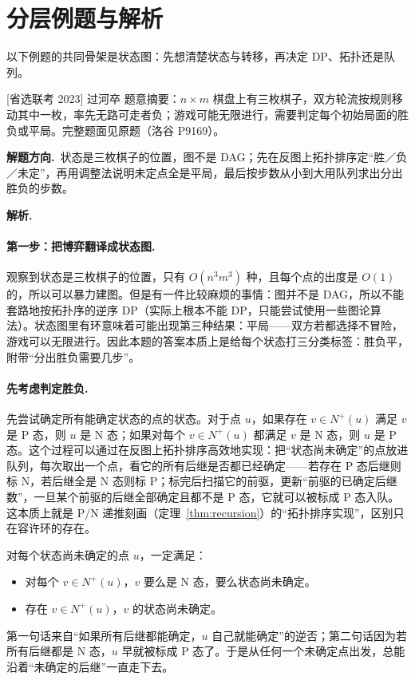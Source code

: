 \documentclass[UTF8,a4paper,11pt,oneside,openany,fontset=fandol]{ctexbook}
\theoremstyle{definition}
\newcommand{\Np}{N^+}
\newcommand{\sol}{\par\noindent\textbf{解析.}\ }
\newcommand{\hint}{\par\noindent\textbf{解题方向.}\ }
\begin{document}
\section{分层例题与解析}

以下例题的共同骨架是状态图：先想清楚状态与转移，再决定 DP、拓扑还是队列。

\begin{problem}{[省选联考 2023] 过河卒}
题意摘要：$n\times m$ 棋盘上有三枚棋子，双方轮流按规则移动其中一枚，率先无路可走者负；游戏可能无限进行，需要判定每个初始局面的胜负或平局。完整题面见原题（洛谷 P9169）。
\end{problem}

\hint 状态是三枚棋子的位置，图不是 DAG；先在反图上拓扑排序定“胜／负／未定”，再用调整法说明未定点全是平局，最后按步数从小到大用队列求出分出胜负的步数。

\sol \paragraph{第一步：把博弈翻译成状态图.} 观察到状态是三枚棋子的位置，只有 $O(n^3m^3)$ 种，且每个点的出度是 $O(1)$ 的，所以可以暴力建图。但是有一件比较麻烦的事情：图并不是 DAG，所以不能套路地按拓扑序的逆序 DP（实际上根本不能 DP，只能尝试使用一些图论算法）。状态图里有环意味着可能出现第三种结果：平局——双方若都选择不冒险，游戏可以无限进行。因此本题的答案本质上是给每个状态打三分类标签：胜负平，附带“分出胜负需要几步”。

\paragraph{先考虑判定胜负.} 先尝试确定所有能确定状态的点的状态。对于点 $u$，如果存在 $v\in\Np(u)$ 满足 $v$ 是 P 态，则 $u$ 是 N 态；如果对每个 $v\in\Np(u)$ 都满足 $v$ 是 N 态，则 $u$ 是 P 态。这个过程可以通过在反图上拓扑排序高效地实现：把“状态尚未确定”的点放进队列，每次取出一个点，看它的所有后继是否都已经确定——若存在 P 态后继则标 N，若后继全是 N 态则标 P；标完后扫描它的前驱，更新“前驱的已确定后继数”，一旦某个前驱的后继全部确定且都不是 P 态，它就可以被标成 P 态入队。这本质上就是 P/N 递推刻画（定理~\ref{thm:recursion}）的“拓扑排序实现”，区别只在容许环的存在。

对每个状态尚未确定的点 $u$，一定满足：
\begin{itemize}
\item 对每个 $v\in\Np(u)$，$v$ 要么是 N 态，要么状态尚未确定。
\item 存在 $v\in\Np(u)$，$v$ 的状态尚未确定。
\end{itemize}
第一句话来自“如果所有后继都能确定，$u$ 自己就能确定”的逆否；第二句话因为若所有后继都是 N 态，$u$ 早就被标成 P 态了。于是从任何一个未确定点出发，总能沿着“未确定的后继”一直走下去。
\end{document}
